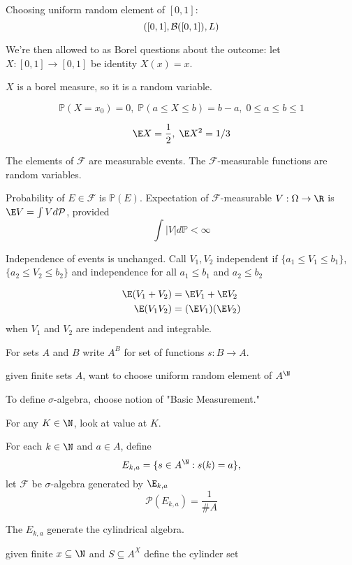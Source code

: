 \begin{example}
	Choosing uniform random element of $[0,1]$:
	 \[
		 ([0,1], \mathcal{B}([0,1]), L)
	\] 
\end{example}

We're then allowed to as Borel questions about the outcome:
let
$X : [0,1] \to [0,1]$ be identity $X(x) = x$.

$X$ is a borel measure, so it is a random variable.

 \[
	\mathbb{P}(X = x_0) =0, \; \mathbb{P}(a \leq X \leq b) = b-a, \; 0 \leq a \leq b \leq 1
\]

\[
	\E X = \frac{1}{2}, \; \E X^2 = 1/3
\] 

The elements of $\mathcal{F}$ are measurable events. The $\mathcal{F}$-measurable functions are random variables.

Probability of $E \in \mathcal{F}$ is $\mathbb{P}(E)$. Expectation of $\mathcal{F}$-measurable $V : \Omega \to \R$ is $\E V = \int V d \mathcal{P}$, provided
\[
	\int |V| d \mathbb{P} < \infty
\] 

Independence of events is unchanged. Call $V_1, V_2$ independent if $\{ a_1 \leq V_1 \leq b_1 \}$,
$\{ a_2 \leq V_2 \leq b_2 \}$ and independence for all  $a_1 \leq b_1$ and $a_2 \leq b_2$


\begin{align*}
	\E ( V_1 + V_2 ) &= \E V_1 + \E V_2 \\
	\E (V_1 V_2 ) &= ( \E V_1 ) (\E V_2)
\end{align*} when $V_1$ and $V_2$ are independent and integrable.

\begin{definition}
	For sets $A$ and $B$ write $A^B$ for set of functions $s : B \to A$.
\end{definition}

given finite sets $A$, want to choose uniform random element of $A^{\N}$
 

To define $\sigma$-algebra, choose notion of "Basic Measurement."

For any $K \in \N$, look at value at $K.$


For each  $k \in \N$ and $a \in A$, define
\[
	E_{k,a} = \{ s \in A^{\N} : s(k) = a \},
\] 
let $\mathcal{F}$ be $\sigma$-algebra generated by $\E_{k,a}$ 
\[
	\mathcal{P}(E_{k,a}) = \frac{1}{\#A}
\] 

The $E_{k,a}$ generate the cylindrical algebra.


given finite $x \subseteq \N$ and $S \subseteq A^X$ define the cylinder set

